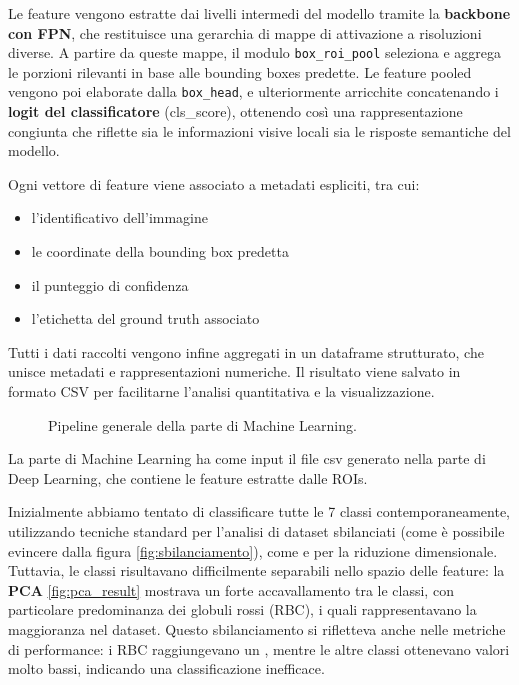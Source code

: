 \documentclass[minted, draw]{../tex/hebdomon}
\begin{document}
Le feature vengono estratte dai livelli intermedi del modello tramite la \textbf{backbone con FPN}, che restituisce una gerarchia di mappe di attivazione a risoluzioni diverse. A partire da queste mappe, il modulo \texttt{box\_roi\_pool} seleziona e aggrega le porzioni rilevanti in base alle bounding boxes predette. Le feature pooled vengono poi elaborate dalla \texttt{box\_head}, e ulteriormente arricchite concatenando i \textbf{logit del classificatore} (cls\_score), ottenendo così una rappresentazione congiunta che riflette sia le informazioni visive locali sia le risposte semantiche del modello.


Ogni vettore di feature viene associato a metadati espliciti, tra cui:
\begin{itemize}
	\item l'identificativo dell'immagine
	\item le coordinate della bounding box predetta
	\item il punteggio di confidenza
	\item l’etichetta del ground truth associato
\end{itemize}
 

Tutti i dati raccolti vengono infine aggregati in un dataframe strutturato, che unisce metadati e rappresentazioni numeriche. Il risultato viene salvato in formato CSV per facilitarne l’analisi quantitativa e la visualizzazione.



%
\begin{figure}[H]
	\centering
	
	\caption{Pipeline generale della parte di Machine Learning.}
\end{figure}
%
La parte di Machine Learning ha come input il file csv generato nella parte di Deep Learning, che contiene le feature estratte dalle ROIs.


Inizialmente abbiamo tentato di classificare tutte le 7 classi contemporaneamente, utilizzando tecniche standard per l’analisi di dataset sbilanciati (come è possibile evincere dalla figura \ref{fig:sbilanciamento}), come  e  per la riduzione dimensionale. Tuttavia, le classi risultavano difficilmente separabili nello spazio delle feature: la \textbf{PCA} \ref{fig:pca_result}  mostrava un forte accavallamento tra le classi, con particolare predominanza dei globuli rossi (RBC), i quali rappresentavano la maggioranza nel dataset. Questo sbilanciamento si rifletteva anche nelle metriche di performance: i RBC raggiungevano un , mentre le altre classi ottenevano valori molto bassi, indicando una classificazione inefficace.
\end{document}
